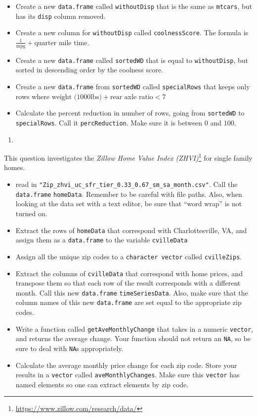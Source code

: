 \documentclass[
  12pt,
  krantz2]{krantz}
\providecommand{\tightlist}{%
  \setlength{\itemsep}{0pt}\setlength{\parskip}{0pt}}
\renewcommand{\href}[2]{#2\footnote{\url{#1}}}
\begin{document}
\begin{itemize}
\tightlist
\item
  Create a new \texttt{data.frame} called \texttt{withoutDisp} that is the same as \texttt{mtcars}, but has its \texttt{disp} column removed.
\item
  Create a new column for \texttt{withoutDisp} called \texttt{coolnessScore}. The formula is \(\frac{1}{\text{mpg}} + \text{quarter mile time}\).
\item
  Create a new \texttt{data.frame} called \texttt{sortedWD} that is equal to \texttt{withoutDisp}, but sorted in descending order by the coolness score.
\item
  Create a new \texttt{data.frame} from \texttt{sortedWD} called \texttt{specialRows} that keeps only rows where \(\text{weight (1000lbs)} + \text{rear axle ratio} < 7\)
\item
  Calculate the percent reduction in number of rows, going from \texttt{sortedWD} to \texttt{specialRows}. Call it \texttt{percReduction}. Make sure it is between \(0\) and \(100\).
\end{itemize}

\begin{enumerate}
\def\labelenumi{\arabic{enumi}.}
\setcounter{enumi}{2}
\tightlist
\item
\end{enumerate}

This question investigates the \href{https://www.zillow.com/research/data/}{\emph{Zillow Home Value Index (ZHVI)}} for single family homes.

\begin{itemize}
\tightlist
\item
  read in \texttt{"Zip\_zhvi\_uc\_sfr\_tier\_0.33\_0.67\_sm\_sa\_month.csv"}. Call the \texttt{data.frame} \texttt{homeData}. Remember to be careful with file paths. Also, when looking at the data set with a text editor, be sure that ``word wrap'' is not turned on.
\item
  Extract the rows of \texttt{homeData} that correspond with Charlottesville, VA, and assign them as a \texttt{data.frame} to the variable \texttt{cvilleData}
\item
  Assign all the unique zip codes to a \texttt{character\ vector} called \texttt{cvilleZips}.
\item
  Extract the columns of \texttt{cvilleData} that correspond with home prices, and transpose them so that each row of the result corresponds with a different month. Call this new \texttt{data.frame} \texttt{timeSeriesData}. Also, make sure that the column names of this new \texttt{data.frame} are set equal to the appropriate zip codes.
\item
  Write a function called \texttt{getAveMonthlyChange} that takes in a numeric \texttt{vector}, and returns the average change. Your function should not return an \texttt{NA}, so be sure to deal with \texttt{NA}s appropriately.
\item
  Calculate the average monthly price change for each zip code. Store your results in a \texttt{vector} called \texttt{aveMonthlyChanges}. Make sure this \texttt{vector} has named elements so one can extract elements by zip code.
\end{itemize}
\end{document}
